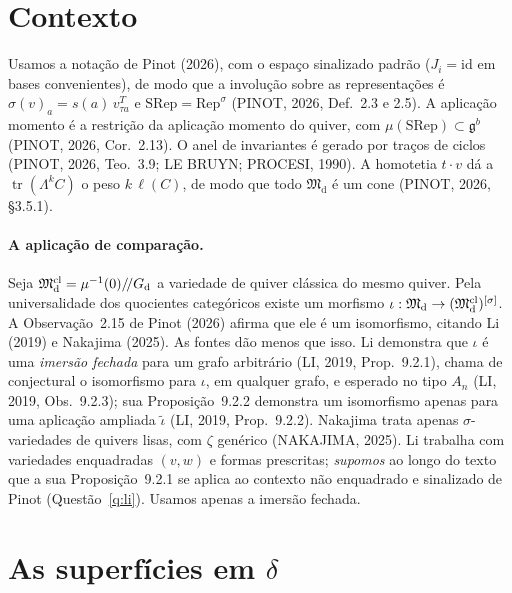\documentclass[11pt]{article}
\theoremstyle{definition}
\theoremstyle{remark}
\newcommand{\M}{\mathfrak{M}}\newcommand{\Rep}{\mathrm{Rep}}\newcommand{\SRep}{\mathrm{SRep}}
\begin{document}
\section{Contexto}\label{sec:setup}
Usamos a notação de Pinot (2026), com o espaço sinalizado padrão ($J_i=\mathrm{id}$ em bases convenientes), de modo que a involução sobre as representações é $\sigma(v)_a=s(a)\,v_{\tau a}^{T}$ e $\SRep=\Rep^\sigma$ (PINOT, 2026, Def.~2.3 e 2.5). A aplicação momento é a restrição da aplicação momento do quiver, com $\mu(\SRep)\subset\mathfrak g^b$ (PINOT, 2026, Cor.~2.13). O anel de invariantes é gerado por traços de ciclos (PINOT, 2026, Teo.~3.9; LE BRUYN; PROCESI, 1990). A homotetia $t\cdot v$ dá a $\operatorname{tr}(\Lambda^kC)$ o peso $k\,\ell(C)$, de modo que todo $\M_{\mathrm d}$ é um cone (PINOT, 2026, \S3.5.1).

\paragraph{A aplicação de comparação.} Seja $\M^{\rm cl}_{\mathrm d}=\mu^{-1}(0)/\!/G_{\mathrm d}$ a variedade de quiver clássica do mesmo quiver. Pela universalidade dos quocientes categóricos existe um morfismo $\iota:\M_{\mathrm d}\to(\M^{\rm cl}_{\mathrm d})^{[\sigma]}$. A Observação~2.15 de Pinot (2026) afirma que ele é um isomorfismo, citando Li (2019) e Nakajima (2025). As fontes dão menos que isso. Li demonstra que $\iota$ é uma \emph{imersão fechada} para um grafo arbitrário (LI, 2019, Prop.~9.2.1), chama de conjectural o isomorfismo para $\iota$, em qualquer grafo, e esperado no tipo $A_n$ (LI, 2019, Obs.~9.2.3); sua Proposição~9.2.2 demonstra um isomorfismo apenas para uma aplicação ampliada $\tilde\iota$ (LI, 2019, Prop.~9.2.2). Nakajima trata apenas $\sigma$-variedades de quivers lisas, com $\zeta$ genérico (NAKAJIMA, 2025). Li trabalha com variedades enquadradas $(v,w)$ e formas prescritas; \emph{supomos} ao longo do texto que a sua Proposição~9.2.1 se aplica ao contexto não enquadrado e sinalizado de Pinot (Questão~\ref{q:li}). Usamos apenas a imersão fechada.

\section{As superfícies em $\delta$}\label{sec:delta}
\end{document}
